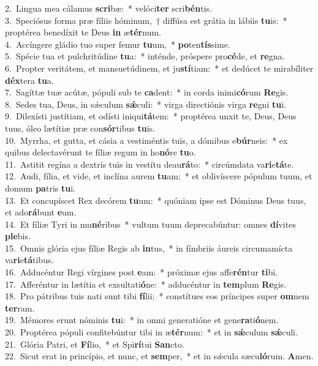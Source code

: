 {2.~}Lingua mea cálamus \textbf{scri}bæ:~* velóci\textbf{ter} scri\textbf{bén}tis.\\
{3.~}Speciósus forma præ fíliis hóminum,~† diffúsa est grátia in lábiis \textbf{tu}is:~* proptérea benedíxit te Deus \textbf{in} æ\textbf{tér}num.\\
{4.~}Accíngere gládio tuo super femur \textbf{tu}um,~* \textbf{po}ten\textbf{tís}sime.\\
{5.~}Spécie tua et pulchritúdine \textbf{tu}a:~* inténde, próspere pro\textbf{cé}de, et \textbf{re}gna.\\
{6.~}Propter veritátem, et mansuetúdinem, et ju\textbf{stí}tiam:~* et dedúcet te mirabíliter \textbf{déx}tera \textbf{tu}a.\\
{7.~}Sagíttæ tuæ acútæ, pópuli sub te \textbf{ca}dent:~* in corda inimi\textbf{có}rum \textbf{Re}gis.\\
{8.~}Sedes tua, Deus, in sǽculum \textbf{sǽ}culi:~* virga directiónis virga \textbf{re}gni \textbf{tu}i.\\
{9.~}Dilexísti justítiam, et odísti iniqui\textbf{tá}tem:~* proptérea unxit te, Deus, Deus tuus, óleo lætítiæ præ con\textbf{sór}tibus \textbf{tu}is.\\
{10.~}Myrrha, et gutta, et cásia a vestiméntis tuis, a dómibus e\textbf{búr}neis:~* ex quibus delectavérunt te fíliæ regum in ho\textbf{nó}re \textbf{tu}o.\\
{11.~}Astitit regína a dextris tuis in vestítu deau\textbf{rá}to:~* circúmdata va\textbf{ri}e\textbf{tá}te.\\
{12.~}Audi, fília, et vide, et inclína aurem \textbf{tu}am:~* et oblivíscere pópulum tuum, et domum \textbf{pa}tris \textbf{tu}i.\\
{13.~}Et concupíscet Rex decórem \textbf{tu}um:~* quóniam ipse est Dóminus Deus tuus, et ado\textbf{rá}bunt \textbf{e}um.\\
{14.~}Et fíliæ Tyri in mu\textbf{né}ribus~* vultum tuum deprecabúntur: omnes \textbf{dí}vites \textbf{ple}bis.\\
{15.~}Omnis glória ejus fíliæ Regis ab \textbf{in}tus,~* in fímbriis áureis circumamícta va\textbf{ri}e\textbf{tá}tibus.\\
{16.~}Adducéntur Regi vírgines post \textbf{e}am:~* próximæ ejus affe\textbf{rén}tur \textbf{ti}bi.\\
{17.~}Afferéntur in lætítia et exsultati\textbf{ó}ne:~* adducéntur in \textbf{tem}plum \textbf{Re}gis.\\
{18.~}Pro pátribus tuis nati sunt tibi \textbf{fí}lii:~* constítues eos príncipes super \textbf{om}nem \textbf{ter}ram.\\
{19.~}Mémores erunt nóminis \textbf{tu}i:~* in omni generatióne et gene\textbf{ra}ti\textbf{ó}nem.\\
{20.~}Proptérea pópuli confitebúntur tibi in æ\textbf{tér}num:~* et in \textbf{sǽ}culum \textbf{sǽ}culi.\\
{21.~}Glória Patri, et \textbf{Fí}lio,~* et Spi\textbf{rí}tui \textbf{San}cto.\\
{22.~}Sicut erat in princípio, et nunc, et \textbf{sem}per,~* et in sǽcula sæcu\textbf{ló}rum. \textbf{A}men.\\
